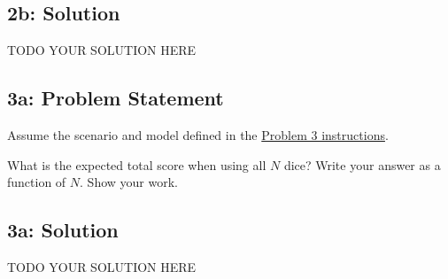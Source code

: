 \documentclass[10pt]{article}
\newcommand{\officialdirections}[1]{{\color{purple} #1}}
\begin{document}
\subsection{2b: Solution}
TODO YOUR SOLUTION HERE

\newpage
\officialdirections{
\subsection*{3a: Problem Statement}
Assume the scenario and model defined in the \href{https://www.cs.tufts.edu/cs/136/2024s/hw0.html#problem-3}{Problem 3 instructions}. 

What is the expected total score when using all $N$ dice? Write your answer as a function of $N$. Show your work.
}

\subsection{3a: Solution}

TODO YOUR SOLUTION HERE
\end{document}

